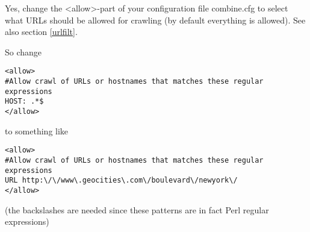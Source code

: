 \begin{enumerate}
Yes, change the <allow>-part of your configuration file combine.cfg
to select what URLs should be allowed for crawling (by default everything
is allowed). See also section \ref{urlfilt}.

So change\\
\begin{verbatim}
<allow>
#Allow crawl of URLs or hostnames that matches these regular expressions
HOST: .*$
</allow>
\end{verbatim}
to something like

\begin{verbatim}
<allow>
#Allow crawl of URLs or hostnames that matches these regular expressions
URL http:\/\/www\.geocities\.com\/boulevard\/newyork\/
</allow>
\end{verbatim}

(the backslashes are needed since these patterns are in fact Perl regular expressions)

\end{enumerate}
